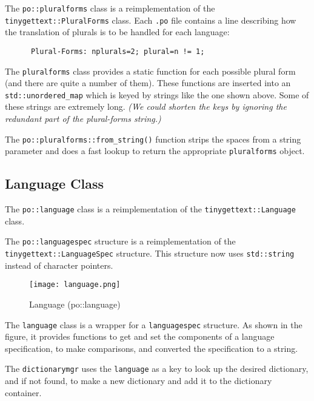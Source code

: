    The \texttt{po::pluralforms} class is a reimplementation of the
   \texttt{tinygettext::PluralForms} class.
   Each \texttt{.po} file contains a line describing how the translation of
   plurals is to be handled for each language:

   \begin{verbatim}
      Plural-Forms: nplurals=2; plural=n != 1;
   \end{verbatim}
   
   The \texttt{pluralforms} class provides a static function for each
   possible plural form (and there are quite a number of them).
   These functions are inserted into an \texttt{std::unordered\_map}
   which is keyed by strings like the one shown above.
   Some of these strings are extremely long.
   \textsl{(We could shorten the keys by ignoring the redundant part
   of the plural-forms string.)}

   The \texttt{po::pluralforms::from\_string()} function strips the
   spaces from a string parameter and does a fast lookup to return the
   appropriate \texttt{pluralforms} object.

\subsection{Language Class}
\label{subsec:potext_language_class}

   The \texttt{po::language} class is a reimplementation of the
   \texttt{tinygettext::Language} class.

   The \texttt{po::languagespec} structure is a reimplementation of the
   \texttt{tinygettext::LanguageSpec} structure.
   This structure now uses \texttt{std::string} instead of character pointers.

\begin{figure}[H]
   \centering 
   \texttt{[image: language.png]}
   \caption{Language (po::language)}
   \label{fig:potext_language}
\end{figure}

   The \texttt{language} class is a wrapper for a
   \texttt{languagespec} structure.
   As shown in the figure, it provides functions to get and set the
   components of a language specification, to make comparisons, and
   converted the specification to a string.

   The \texttt{dictionarymgr} uses the
   \texttt{language} as a key to look up the desired dictionary, and
   if not found, to make a new dictionary and add it to the dictionary
   container.

